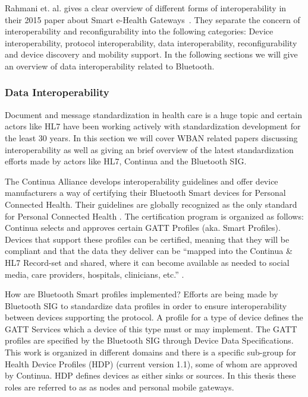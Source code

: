 Rahmani et. al. gives a clear overview of different forms of interoperability in their 2015 paper about Smart e-Health Gateways~\cite{DrAmirMohammadRahmani:2014vx}. They separate the concern of interoperability and reconfigurability into the following categories: Device interoperability, protocol interoperability, data interoperability, reconfigurability and device discovery and mobility support. In the following sections we will give an overview of data interoperability related to Bluetooth.

\subsubsection{Data Interoperability} %
\label{ssub:data_interoperability}


Document and message standardization in health care is a huge topic and certain actors like HL7 have been working actively with standardization development for the least 30 years. In this section we will cover WBAN related papers discussing interoperability as well as giving an brief overview of the latest standardization efforts made by actors like HL7, Continua and the Bluetooth SIG.

The Continua Alliance develops interoperability guidelines and offer device manufacturers a way of certifying their Bluetooth Smart devices for Personal Connected Health. Their guidelines are globally recognized as the only standard for Personal Connected Health \cite{newRef:27}. The certification program is organized as follows: Continua selects and approves certain GATT Profiles (aka. Smart Profiles). Devices that support these profiles can be certified, meaning that they will be compliant and that the data they deliver can be ``mapped into the Continua & HL7 Record-set and shared, where it can become available as needed to social media, care providers, hospitals, clinicians, etc.'' \cite{newRef:27}.

How are Bluetooth Smart profiles implemented? Efforts are being made by Bluetooth SIG to standardize data profiles in order to ensure interoperability between devices supporting the protocol. A profile for a type of device defines the GATT Services which a device of this type must or may implement. The GATT profiles are specified by the Bluetooth SIG through Device Data Specifications. This work is organized in different domains and there is a specific sub-group for Health Device Profiles (HDP) (current version 1.1), some of whom are approved by Continua. HDP defines devices as either sinks or sources. In this thesis these roles are referred to as as nodes and personal mobile gateways.

